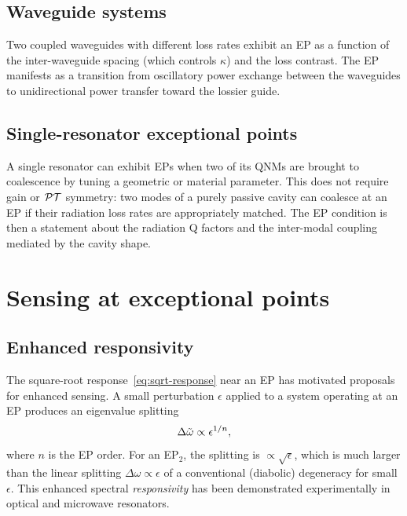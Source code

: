 \subsection{Waveguide systems}
\label{ssec:ep-waveguides}

Two coupled waveguides with different loss rates exhibit an EP as a
function of the inter-waveguide spacing (which controls $\kappa$) and
the loss contrast. The EP manifests as a transition from oscillatory
power exchange between the waveguides to unidirectional power transfer
toward the lossier guide.

\subsection{Single-resonator exceptional points}
\label{ssec:ep-single}

A single resonator can exhibit EPs when two of its QNMs are brought to
coalescence by tuning a geometric or material parameter. This does not
require gain or $\mathcal{PT}$ symmetry: two modes of a purely passive cavity can
coalesce at an EP if their radiation loss rates are appropriately matched.
The EP condition is then a statement about the radiation Q factors and
the inter-modal coupling mediated by the cavity shape.


\section{Sensing at exceptional points}
\label{sec:ep-sensing}

\subsection{Enhanced responsivity}
\label{ssec:ep-responsivity}

The square-root response~\eqref{eq:sqrt-response} near an EP has motivated
proposals for enhanced sensing. A small perturbation $\epsilon$ applied
to a system operating at an EP produces an eigenvalue splitting
\begin{equation}
 \Delta\tilde{\omega} \propto \epsilon^{1/n},
 \label{eq:ep-sensing}
\end{equation}
where $n$ is the EP order. For an EP$_2$, the splitting is
$\propto \sqrt{\epsilon}$, which is much larger than the linear splitting
$\Delta\omega \propto \epsilon$ of a conventional (diabolic) degeneracy
for small $\epsilon$. This enhanced spectral \emph{responsivity} has been
demonstrated experimentally in optical and microwave resonators.

